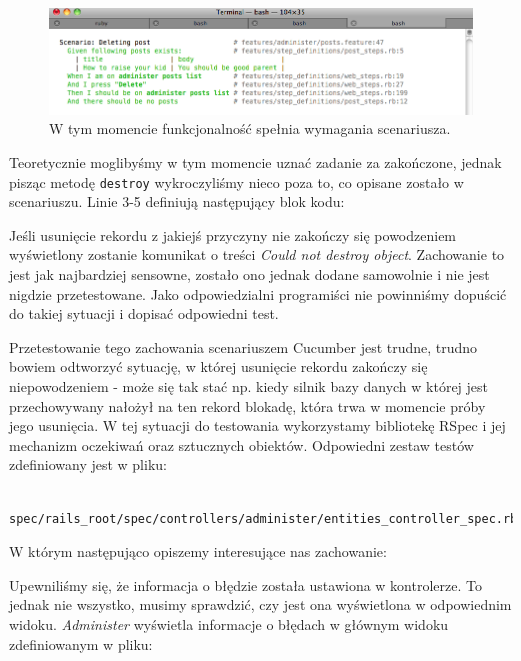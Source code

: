    \begin{figure}[!h]
 		\begin{center}
 			\includegraphics[width=\linewidth]{images/delete_record_scenario_pass.png}
 			\caption{W tym momencie funkcjonalność spełnia wymagania scenariusza.}
 			\label{delete_record_scenario_pass}
 		\end{center}
 	\end{figure}
 	
 	Teoretycznie moglibyśmy w tym momencie uznać zadanie za zakończone, jednak pisząc metodę \texttt{destroy} wykroczyliśmy nieco poza to, co opisane zostało w scenariuszu. Linie 3-5 definiują następujący blok kodu:
 	
 	
 	
 	Jeśli usunięcie rekordu z jakiejś przyczyny nie zakończy się powodzeniem wyświetlony zostanie komunikat o treści \emph{Could not destroy object}.
 	Zachowanie to jest jak najbardziej sensowne, zostało ono jednak dodane samowolnie i nie jest nigdzie przetestowane. Jako odpowiedzialni programiści nie powinniśmy dopuścić do takiej sytuacji i dopisać odpowiedni test. 
 	
 	Przetestowanie tego zachowania scenariuszem Cucumber jest trudne, trudno bowiem odtworzyć sytuację, w której usunięcie rekordu zakończy się niepowodzeniem - może się tak stać np. kiedy silnik bazy danych w której jest przechowywany nałożył na ten rekord blokadę, która trwa w momencie próby jego usunięcia. W tej sytuacji do testowania wykorzystamy bibliotekę RSpec i jej mechanizm oczekiwań oraz sztucznych obiektów. Odpowiedni zestaw testów zdefiniowany jest w pliku:
 	
 	\begin{lstlisting}
 	spec/rails_root/spec/controllers/administer/entities_controller_spec.rb
 	\end{lstlisting}
 	
 	W którym następująco opiszemy interesujące nas zachowanie:
 	
 	
 	
 	Upewniliśmy się, że informacja o błędzie została ustawiona w kontrolerze. To jednak nie wszystko, musimy sprawdzić, czy jest ona wyświetlona w odpowiednim widoku. \emph{Administer} wyświetla informacje o błędach w głównym widoku zdefiniowanym w pliku:
 	
